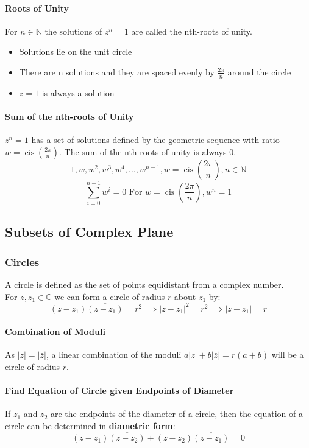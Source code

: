 \documentclass[a4paper,twoside]{article}
\DeclareMathOperator\cis{cis}
\begin{document}
			\paragraph{Roots of Unity} For $n\in\mathbb{N}$ the solutions of $z^n=1$ are called the nth-roots of unity.
			\begin{itemize}
				\item Solutions lie on the unit circle
				\item There are n solutions and they are spaced evenly by $\frac{2\pi}{n}$ around the circle
				\item $z=1$ is always a solution
			\end{itemize}
		
			\paragraph{Sum of the nth-roots of Unity} $z^n=1$ has a set of solutions defined by the geometric sequence with ratio $w=\cis\left(\frac{2\pi}{n}\right)$. The sum of the nth-roots of unity is always 0.
			\[
				1,w,w^2,w^3,w^4,...,w^{n-1},w=\cis\left(\frac{2\pi}{n}\right),n\in\mathbb{N}
			\]
			\[
				\sum\limits_{i=0}^{n-1}w^i=0 \text{ For }w=\cis\left(\frac{2\pi}{n}\right),w^n=1
			\]
		\subsection{Subsets of Complex Plane}
			\subsubsection{Circles}
				A circle is defined as the set of points equidistant from a complex number.\\
				For $z,z_1\in\mathbb{C}$ we can form a circle of radius $r$ about $z_1$ by:
				\[
					\left(z-z_1\right)\overline{\left(z-z_1\right)}=r^2\implies |z-z_1|^2=r^2 \implies |z-z_1|=r
				\]
				\paragraph{Combination of Moduli} As $|z|=|\bar{z}|$, a linear combination of the moduli $a|z|+b|\bar{z}|=r(a+b)$ will be a circle of radius $r$.
				\paragraph{Find Equation of Circle given Endpoints of Diameter} If $z_1$ and $z_2$ are the endpoints of the diameter of a circle, then the equation of a circle can be determined in \textbf{diametric form}:
				\[
					(z-z_1)\overline{\left(z-z_2\right)}+(z-z_2)\overline{\left(z-z_1\right)}=0
				\]
\end{document}
